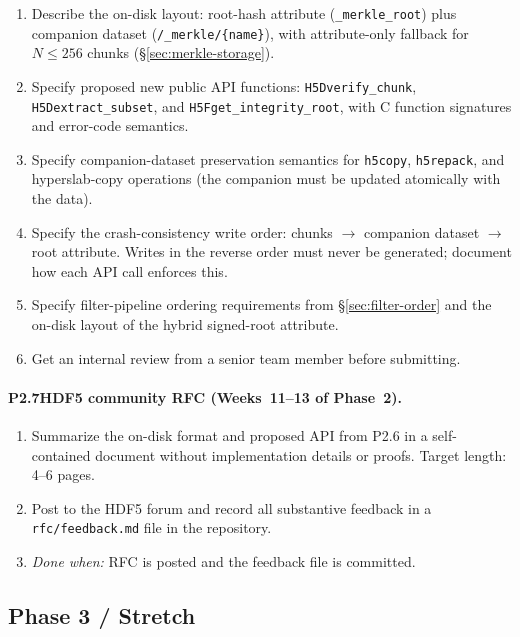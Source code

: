 \documentclass[11pt]{article}
\begin{document}
\begin{enumerate}[nosep]
  \item Describe the on-disk layout: root-hash attribute
    (\texttt{\_merkle\_root}) plus companion dataset
    (\texttt{/\_merkle/\{name\}}), with attribute-only fallback for
    $N \leq 256$ chunks (\S\ref{sec:merkle-storage}).
  \item Specify proposed new public API functions:
    \texttt{H5Dverify\_chunk},
    \texttt{H5Dextract\_\allowbreak{}subset}, and
    \texttt{H5Fget\_\allowbreak{}integrity\_root},
    with C function signatures and error-code semantics.
  \item Specify companion-dataset preservation semantics for
    \texttt{h5copy}, \texttt{h5repack}, and hyperslab-copy operations
    (the companion must be updated atomically with the data).
  \item Specify the crash-consistency write order:
    chunks $\to$ companion dataset $\to$ root attribute. Writes in the
    reverse order must never be generated; document how each API call
    enforces this.
  \item Specify filter-pipeline ordering requirements from
    \S\ref{sec:filter-order} and the on-disk layout of the hybrid
    signed-root attribute.
  \item Get an internal review from a senior team member before submitting.
\end{enumerate}

\paragraph{P2.7\enspace HDF5 community RFC (Weeks~11--13 of Phase~2).}

\begin{enumerate}[nosep]
  \item Summarize the on-disk format and proposed API from P2.6 in a
    self-contained document without implementation details or proofs.
    Target length: 4--6 pages.
  \item Post to the HDF5 forum and record all substantive feedback in a
    \texttt{rfc/feedback.md} file in the repository.
  \item \emph{Done when:} RFC is posted and the feedback file is committed.
\end{enumerate}

\subsection{Phase 3 / Stretch}
\end{document}
